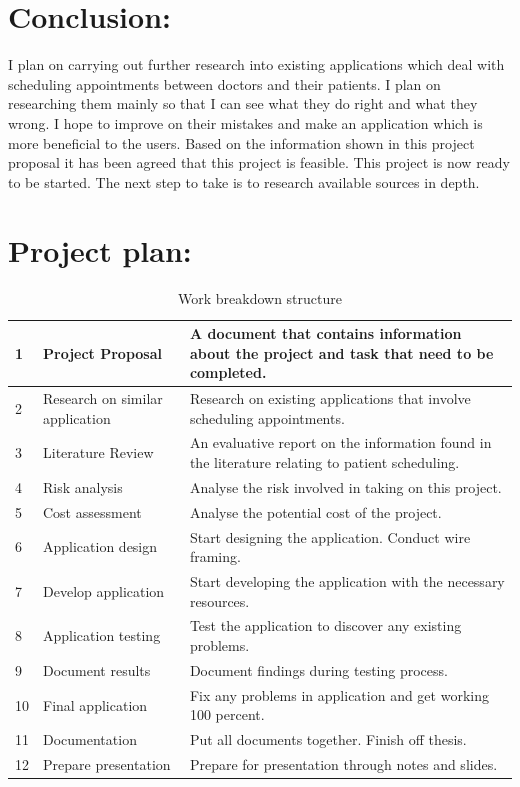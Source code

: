 \documentclass[12pt,ITBthesis]{report}
\begin{document}
	\section{Conclusion:}
	I plan on carrying out further research into existing applications which deal with scheduling appointments between doctors and their patients. I plan on researching them mainly so that I can see what they do right and what they wrong. I hope to improve on their mistakes and make an application which is more beneficial to the users. Based on the information shown in this project proposal it has been agreed that this project is feasible. This project is now ready to be started. The next step to take is to research available sources in depth.
	
	\renewcommand*{\bibname}{\section{References}}
	
	
	   
	\section{Project plan:}
	\begin{table}[!h]
		\centering
		\label{my-label}
		\begin{tabular}{l|l|p{8cm}}
		\hline
		1 & Project Proposal & A document that contains information about the project and task that need to be completed.\\ \hline
		2 & Research on similar application & Research on existing applications that involve scheduling appointments.\\ \hline
		3 & Literature Review & An evaluative report on the information found in the literature relating to patient scheduling. \\ \hline
		4 & Risk analysis & Analyse the risk involved in taking on this project.\\ \hline
		5 & Cost assessment & Analyse the potential cost of the project.\\ \hline
		6 & Application design & Start designing the application. Conduct wire framing.\\ \hline
		7 & Develop application & Start developing the application with the necessary resources.\\ \hline
		8 & Application testing & Test the application to discover any existing problems.\\ \hline
		9 & Document results & Document findings during testing process.\\ \hline
		10 & Final application & Fix any problems in application and get working 100 percent.\\ \hline
		11 & Documentation & Put all documents together. Finish off thesis.\\
		12 & Prepare presentation & Prepare for presentation through notes and slides.
		\end{tabular}
		\caption{Work breakdown structure}
	\end{table}
	
\end{document}
